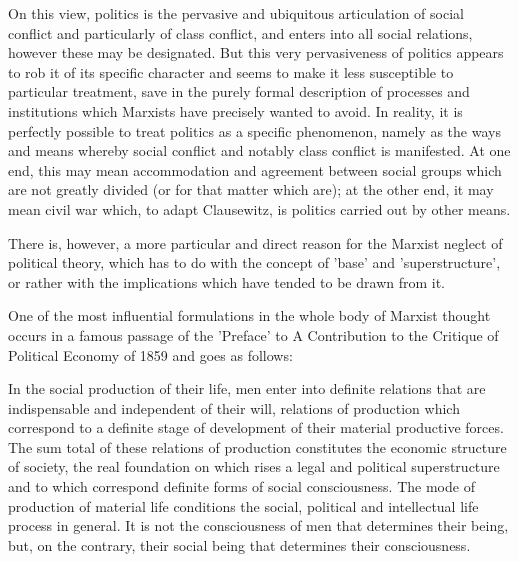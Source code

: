 On this view, politics is the pervasive and ubiquitous articulation of social conflict and particularly of class conflict, and enters into all social relations, however these may be designated. But this very pervasiveness of politics appears to rob it of its specific character and seems to make it less susceptible to particular treatment, save in the purely formal description of processes and institutions which Marxists have precisely wanted to avoid. In reality, it is perfectly possible to treat politics as a specific phenomenon, namely as the ways and means whereby social conflict and notably class conflict is manifested. At one end, this may mean accommodation and agreement between social groups which are not greatly divided (or for that matter which are); at the other end, it may mean civil war which, to adapt Clausewitz, is politics carried out by other means.

There is, however, a more particular and direct reason for the Marxist neglect of political theory, which has to do with the concept of 'base' and 'superstructure', or rather with the implications which have tended to be drawn from it.

One of the most influential formulations in the whole body of Marxist thought occurs in a famous passage of the 'Preface' to A Contribution to the Critique of Political Economy of 1859 and goes as follows: \begin{displayquote}
    In the social production of their life, men enter into definite relations that are indispensable and independent of their will, relations of production which correspond to a definite stage of development of their material productive forces. The sum total of these relations of production constitutes the economic structure of society, the real foundation on which rises a legal and political superstructure and to which correspond definite forms of social consciousness. The mode of production of material life conditions the social, political and intellectual life process in general. It is not the consciousness of men that determines their being, but, on the contrary, their social being that determines their consciousness.
\end{displayquote}

